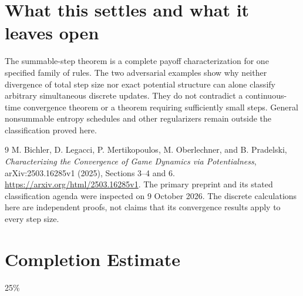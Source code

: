 \documentclass[11pt]{article}
\theoremstyle{definition}
\begin{document}
\section*{What this settles and what it leaves open}
The summable-step theorem is a complete payoff characterization for one specified family of rules. The two adversarial examples show why neither divergence of total step size nor exact potential structure can alone classify arbitrary simultaneous discrete updates. They do not contradict a continuous-time convergence theorem or a theorem requiring sufficiently small steps. General nonsummable entropy schedules and other regularizers remain outside the classification proved here.

\begin{thebibliography}{9}
 M. Bichler, D. Legacci, P. Mertikopoulos, M. Oberlechner, and B. Pradelski, \emph{Characterizing the Convergence of Game Dynamics via Potentialness}, arXiv:2503.16285v1 (2025), Sections 3--4 and 6. \url{https://arxiv.org/html/2503.16285v1}. The primary preprint and its stated classification agenda were inspected on 9 October 2026. The discrete calculations here are independent proofs, not claims that its convergence results apply to every step size.
\end{thebibliography}

\section{Completion Estimate}
25\%
\end{document}

